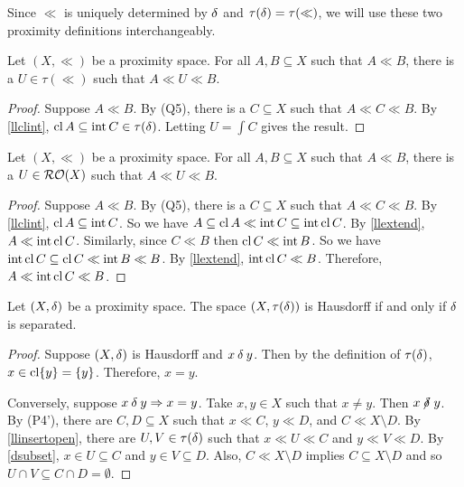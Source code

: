 Since \( \ll \) is uniquely determined by \( \mathbin{\delta} \) and \( \tau(\mathord{\delta}) = \tau(\ll) \), we will use these two proximity definitions interchangeably.

\begin{proposition}
	\label{llinsertopen}
	Let \( (X,\ll) \) be a proximity space.  For all \( A,B \subseteq X \) such that \( A \ll B \), there is a \( U \in \tau(\ll) \) such that \( A \ll U \ll B \).
\end{proposition}
\begin{proof}
	Suppose \( A \ll B \).  By (Q5), there is a \( C \subseteq X \) such that \( A \ll C \ll B \).  By \ref{llclint}, \( \operatorname{cl}{A} \subseteq \operatorname{int}{C} \in \tau(\mathord{\delta}) \).  Letting \( U = \int{C} \) gives the result.
\end{proof}

\begin{proposition}
	\label{llinsertro}
	Let \( (X,\ll) \) be a proximity space.  For all \( A,B \subseteq X \) such that \( A \ll B \), there is a \( U \in \operatorname{\mathcal{RO}}(X) \) such that \( A \ll U \ll B \).
\end{proposition}
\begin{proof}
	Suppose \( A \ll B \).  By (Q5), there is a \( C \subseteq X \) such that \( A \ll C \ll B \).  By \ref{llclint}, \( \operatorname{cl}{A} \subseteq \operatorname{int}{C} \).  So we have \( A \subseteq \operatorname{cl}{A} \ll \operatorname{int}{C} \subseteq \operatorname{int}\operatorname{cl}{C} \).  By \ref{llextend}, \( A \ll \operatorname{int}\operatorname{cl}{C} \).  Similarly, since \( C \ll B \) then \( \operatorname{cl}{C} \ll \operatorname{int}{B} \).  So we have \( \operatorname{int}\operatorname{cl}{C} \subseteq \operatorname{cl}{C} \ll \operatorname{int}{B} \ll B \).  By \ref{llextend}, \( \operatorname{int}\operatorname{cl}{C} \ll B \).  Therefore, \( A \ll \operatorname{int}\operatorname{cl}{C} \ll B \).
\end{proof}

\begin{proposition}
	\label{haussep}
	Let \( (X,\mathord{\delta}) \) be a proximity space.  The space \( (X,\tau(\mathord{\delta})) \) is Hausdorff if and only if \( \mathord{\delta} \) is separated.
\end{proposition}
\begin{proof}
	Suppose \( (X,\mathord{\delta}) \) is Hausdorff and \( x \mathbin{\delta} y \).  Then by the definition of \( \tau(\mathord{\delta}) \), \( x \in \operatorname{cl} \{ y \} = \{ y \} \).  Therefore, \( x = y \).
	
	Conversely, suppose \( x \mathbin{\delta} y \Rightarrow x = y \).  Take \( x,y \in X \) such that \( x \neq y \).  Then \( x \nnear y \).  By (P4'), there are \( C,D \subseteq X \) such that \( x \ll C \), \( y \ll D \), and \( C \ll X \setminus D \).  By \ref{llinsertopen}, there are \( U,V \in \tau(\mathord{\delta}) \) such that \( x \ll U \ll C \) and \( y \ll V \ll D \).  By \ref{dsubset}, \( x \in U \subseteq C \) and \( y \in V \subseteq D \).  Also, \( C \ll X \setminus D \) implies \( C \subseteq X \setminus D \) and so \( U \cap V \subseteq C \cap D = \emptyset \).
\end{proof}

